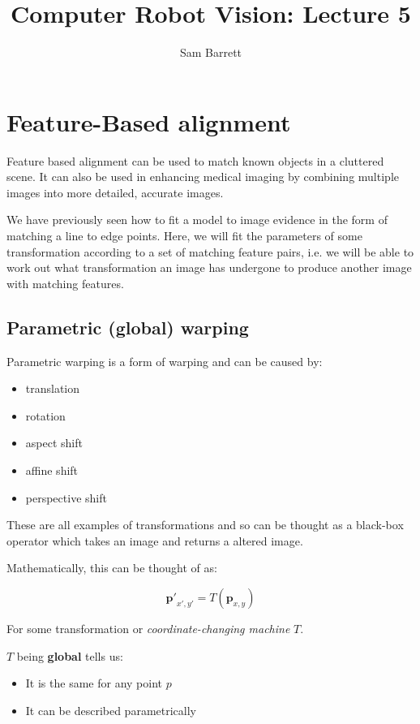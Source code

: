 \documentclass{article}
\title{Computer\/ Robot Vision: Lecture 5}
\author{Sam Barrett}
\begin{document}
\maketitle

\section{Feature-Based alignment}

Feature based alignment can be used to match known objects in a cluttered scene. It can also be used in enhancing medical imaging by combining multiple images into more detailed, accurate images.

We have previously seen how to fit a model to image evidence in the form of matching a line to edge points. Here, we will fit the parameters of some transformation according to a set of matching feature pairs, i.e. we will be able to work out what transformation an image has undergone to produce another image with matching features.

\subsection{Parametric (global) warping}

Parametric warping is a form of warping and can be caused by:

\begin{itemize}
  \item translation
  \item rotation
  \item aspect shift
  \item affine shift
  \item perspective shift
\end{itemize}

These are all examples of transformations and so can be thought as a black-box operator which takes an image and returns a altered image.

Mathematically, this can be thought of as:

\[
 \mathbf{p'}_{x',y'}= T(\mathbf{p}_{x,y})
\]

For some transformation or \textit{coordinate-changing machine} $T$.

$T$ being \textbf{global} tells us:

\begin{itemize}
  \item It is the same for any point $p$
  \item It can be described parametrically
\end{itemize}
\end{document}

